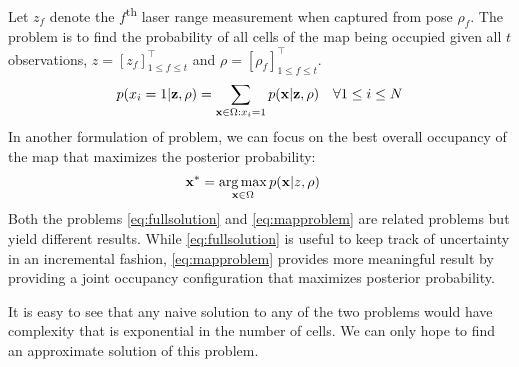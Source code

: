 \documentclass[letterpaper, 10 pt, conference]{ieeeconf} %
\DeclareMathOperator*{\argmax}{arg\,max}
\newcommand{\vect}[1]{\mathbf{#1}}
\begin{document}
Let $z_f$ denote the $f$\textsuperscript{th} laser range measurement when captured from pose $\rho_f$. 
The problem is to find the probability of all cells of the map being occupied
given all $t$ observations, $z = [z_f]^\top_{1 \le f \le t}$ and
$\rho = [\rho_f]^\top_{1 \le f \le t}$.
\begin{align}
  p(x_i = 1 | \measurements, \poses) &= \sum_{\map \in \Omega : x_i = 1} p(\map | \measurements , \poses) & \forall 1 \le i \le N 
  \label{eq:fullsolution}
\end{align}
In another formulation of problem, we can focus on the best overall occupancy of the map that maximizes the posterior probability:
\begin{align}
  \vect{x}^* &= \argmax_{\map \in \Omega } p(\map | z, \rho)
  \label{eq:mapproblem}
\end{align}
Both the problems \eqref{eq:fullsolution} and \eqref{eq:mapproblem} are related
problems but yield different results. While \eqref{eq:fullsolution} is
useful to keep track of uncertainty in an incremental fashion,
\eqref{eq:mapproblem} provides more meaningful result by providing a joint
occupancy configuration that maximizes posterior probability.

It is easy to see that any naive solution to any of the two problems would have complexity that is exponential in the number of cells. We can only hope to find an approximate solution of this problem.
\end{document}
